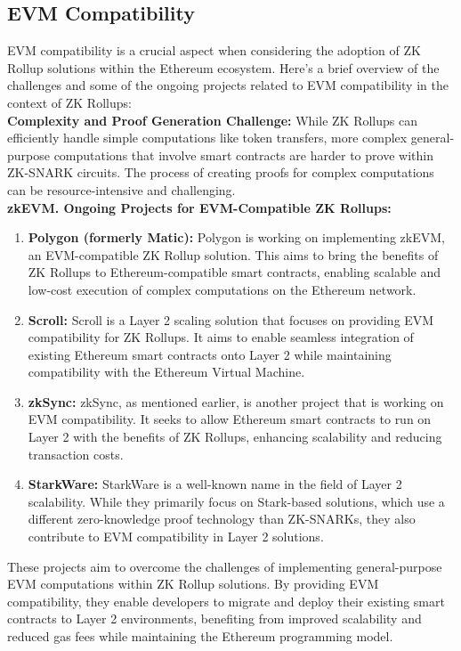 \subsection{EVM Compatibility}
EVM compatibility is a crucial aspect when considering the adoption of ZK Rollup solutions within the Ethereum ecosystem. Here's a brief overview of the challenges and some of the ongoing projects related to EVM compatibility in the context of ZK Rollups:\\
\textbf{Complexity and Proof Generation Challenge:} While ZK Rollups can efficiently handle simple computations like token transfers, more complex general-purpose computations that involve smart contracts are harder to prove within ZK-SNARK circuits. The process of creating proofs for complex computations can be resource-intensive and challenging.\\
\textbf{zkEVM. Ongoing Projects for EVM-Compatible ZK Rollups:}\\
\begin{enumerate}
	\item \textbf{Polygon (formerly Matic):} Polygon is working on implementing zkEVM, an EVM-compatible ZK Rollup solution. This aims to bring the benefits of ZK Rollups to Ethereum-compatible smart contracts, enabling scalable and low-cost execution of complex computations on the Ethereum network.
	\item \textbf{Scroll:} Scroll is a Layer 2 scaling solution that focuses on providing EVM compatibility for ZK Rollups. It aims to enable seamless integration of existing Ethereum smart contracts onto Layer 2 while maintaining compatibility with the Ethereum Virtual Machine.
	\item \textbf{zkSync:} zkSync, as mentioned earlier, is another project that is working on EVM compatibility. It seeks to allow Ethereum smart contracts to run on Layer 2 with the benefits of ZK Rollups, enhancing scalability and reducing transaction costs.
	\item \textbf{StarkWare:} StarkWare is a well-known name in the field of Layer 2 scalability. While they primarily focus on Stark-based solutions, which use a different zero-knowledge proof technology than ZK-SNARKs, they also contribute to EVM compatibility in Layer 2 solutions.
\end{enumerate}
These projects aim to overcome the challenges of implementing general-purpose EVM computations within ZK Rollup solutions. By providing EVM compatibility, they enable developers to migrate and deploy their existing smart contracts to Layer 2 environments, benefiting from improved scalability and reduced gas fees while maintaining the Ethereum programming model.
